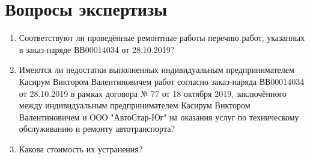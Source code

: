 \setcounter{page}{1}
%
%  
%

%
\section{Вопросы экспертизы}
\begin{enumerate}


\item Соответствуют ли проведённые ремонтные работы перечню работ, указанных в заказ-наряде ВВ00014034 от 28.10.2019?

	\item  Имеются ли недостатки выполненных  индивидуальным предпринимателем Касирум Виктором Валентиновичем работ согласно заказ-наряда ВВ00014034 от 28.10.2019  в рамках договора  № 77 от 18 октября 2019, заключённого между индивидуальным предпринимателем Касирум Виктором Валентиновичем и ООО "АвтоСтар-Юг" на   оказания услуг по техническому обслуживанию и ремонту автотранспорта?	


	\item Какова стоимость их устранения?
\end{enumerate}

%


